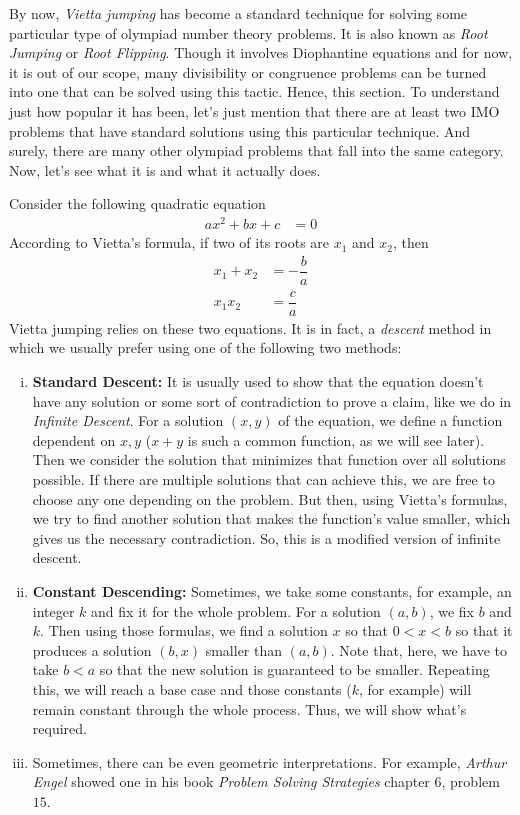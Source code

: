 \documentclass{subfile}
\begin{document}
	By now, \textit{Vietta jumping} has become a standard technique for solving some particular type of olympiad number theory problems. It is also known as \textit{Root Jumping} or \textit{Root Flipping}. Though it involves Diophantine equations and for now, it is out of our scope, many divisibility or congruence problems can be turned into one that can be solved using this tactic. Hence, this section.
	To understand just how popular it has been, let's just mention that there are at least two IMO problems that have standard solutions using this particular technique. And surely, there are many other olympiad problems that fall into the same category. Now, let's see what it is and what it actually does.

	Consider the following quadratic equation
		\begin{align*}
		 	ax^2+bx+c & = 0
		\end{align*}
	According to Vietta's formula, if two of its roots are $x_1$ and $x_2$, then
		\begin{align*}
			x_1+x_2 & = -\dfrac{b}{a}\\
			x_1x_2  & = \dfrac{c}{a}
		\end{align*}
	Vietta jumping relies on these two equations. It is in fact, a \textit{descent} method in which we usually prefer using one of the following two methods:
		\begin{enumerate}[(i)]
			\item \textbf{Standard Descent:} It is usually used to show that the equation doesn't have any solution or some sort of contradiction to prove a claim, like we do in \textit{Infinite Descent}. For a solution $(x,y)$ of the equation, we define a function dependent on $x,y$ ($x+y$ is such a common function, as we will see later). Then we consider the solution that minimizes that function over all solutions possible. If there are multiple solutions that can achieve this, we are free to choose any one depending on the problem. But then, using Vietta's formulas, we try to find another solution that makes the function's value smaller, which gives us the necessary contradiction. So, this is a modified version of infinite descent.
			\item \textbf{Constant Descending:} Sometimes, we take some constants, for example, an integer $k$ and fix it for the whole problem. For a solution $(a,b)$, we fix $b$ and $k$. Then using those formulas, we find a solution $x$ so that $0<x<b$ so that it produces a solution $(b,x)$ smaller than $(a,b)$. Note that, here, we have to take $b<a$ so that the new solution is guaranteed to be smaller. Repeating this, we will reach a base case and those constants ($k$, for example) will remain constant through the whole process. Thus, we will show what's required.
			\item Sometimes, there can be even geometric interpretations. For example, \textit{Arthur Engel} showed one in his book \textit{Problem Solving Strategies} chapter $6$, problem $15$.
		\end{enumerate}
\end{document}
